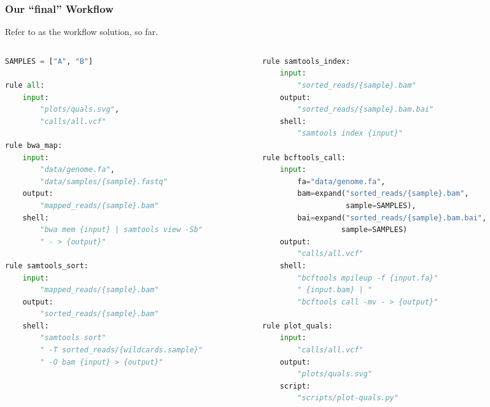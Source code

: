 \begin{frame}[fragile]
	\frametitle{Our ``final'' Workflow}
	\footnotesize{Refer to  as the workflow solution, so far.}
	\vspace{-1em}
	\begin{columns}
		\begin{column}{0.5\textwidth}
			\begin{lstlisting}[language=Python,style=Python,basicstyle=\tiny]
SAMPLES = ["A", "B"]
				
rule all:
	input:
		"plots/quals.svg",
		"calls/all.vcf"
				
rule bwa_map:
	input:
		"data/genome.fa",
		"data/samples/{sample}.fastq"
	output:
		"mapped_reads/{sample}.bam"
	shell:
		"bwa mem {input} | samtools view -Sb"
		" - > {output}"
				
rule samtools_sort:
	input:
	    "mapped_reads/{sample}.bam"
	output:
		"sorted_reads/{sample}.bam"
	shell:
		"samtools sort"
		" -T sorted_reads/{wildcards.sample}"
		" -O bam {input} > {output}"
			\end{lstlisting}
		\end{column}
		\begin{column}{0.5\textwidth}
			\begin{lstlisting}[language=Python,style=Python,basicstyle=\tiny]
rule samtools_index:
	input:
		"sorted_reads/{sample}.bam"
	output:
		"sorted_reads/{sample}.bam.bai"
	shell:
		"samtools index {input}"
				
rule bcftools_call:
	input:
		fa="data/genome.fa",
		bam=expand("sorted_reads/{sample}.bam",
		           sample=SAMPLES),
		bai=expand("sorted_reads/{sample}.bam.bai",
		          sample=SAMPLES)
	output:
		"calls/all.vcf"
	shell:
		"bcftools mpileup -f {input.fa}"
		" {input.bam} | "
		"bcftools call -mv - > {output}"
				
rule plot_quals:
	input:
		"calls/all.vcf"
	output:
		"plots/quals.svg"
	script:
		"scripts/plot-quals.py"
			\end{lstlisting}
		\end{column}
	\end{columns}
\end{frame}







